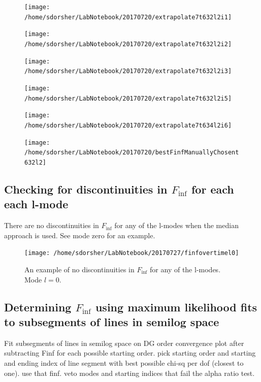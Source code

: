 \begin{figure}
  \texttt{[image: /home/sdorsher/LabNotebook/20170720/extrapolate7t632l2i1]}
\end{figure}

\begin{figure}
  \texttt{[image: /home/sdorsher/LabNotebook/20170720/extrapolate7t632l2i2]}
\end{figure}

\begin{figure}
  \texttt{[image: /home/sdorsher/LabNotebook/20170720/extrapolate7t632l2i3]}
\end{figure}

\begin{figure}
  \texttt{[image: /home/sdorsher/LabNotebook/20170720/extrapolate7t632l2i5]}
\end{figure}

\begin{figure}
  \texttt{[image: /home/sdorsher/LabNotebook/20170720/extrapolate7t634l2i6]}
\end{figure}

\begin{figure}
  \texttt{[image: /home/sdorsher/LabNotebook/20170720/bestFinfManuallyChosent632l2]}
\end{figure}

\subsection{ Checking for discontinuities in $F_{\inf}$ for each each l-mode}

There are no discontinuities in $F_{\inf}$ for any of the l-modes when the median approach is used. See mode zero for an example.

\begin{figure}
  \texttt{[image: /home/sdorsher/LabNotebook/20170727/finfovertimel0]}
  \caption{An example of no discontinuities in $F_{\inf}$ for any of the l-modes. Mode $l=0$.}
\end{figure}


\subsection{Determining $F_{\inf}$ using maximum likelihood fits to subsegments of lines in semilog space}
Fit subsegments of lines in semilog space on DG order convergence plot after subtracting Finf for each possible starting order. pick starting order and starting and ending index of line segment with best possible chi-sq per dof (closest to one). use that finf. veto modes and starting indices that fail the alpha ratio test.

